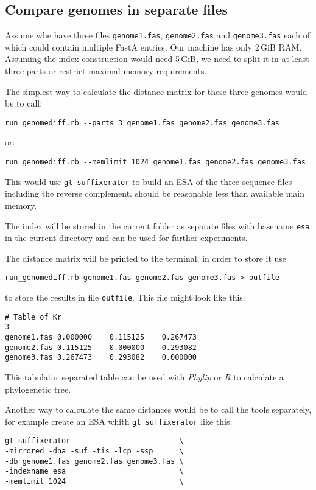 \documentclass[12pt,titlepage]{article}
\newcommand{\Gtsuffixerator}{\texttt{gt suffixerator}\xspace}
\newcommand{\ESA}{ESA\xspace}
\newcommand{\FastA}{FastA\xspace}
\newcommand{\File}[1]{\texttt{\small #1}}
\begin{document}
\subsection{Compare genomes in separate files}

Assume whe have three files \File{genome1.fas}, \File{genome2.fas} and
\File{genome3.fas} each of which could contain multiple \FastA entries. Our
machine has only 2\,GiB RAM. Assuming the index construction
would need 5\,GiB, we need to split it in at least three parts or
restrict maximal memory requirements.

The simplest way to calculate the distance matrix for these three genomes
would be to call:

\lstinline{run_genomediff.rb --parts 3 genome1.fas genome2.fas genome3.fas}

or:

\lstinline{run_genomediff.rb --memlimit 1024 genome1.fas genome2.fas genome3.fas}

This would use \Gtsuffixerator to build an \ESA of the three sequence files
including the reverse complement.  should be reasonable
less than available main memory.

The index will be stored in the current folder as separate files with
basename \File{esa} in the current directory and can be used for further
experiments.

The distance matrix will be printed to the terminal, in order to store it use

\lstinline{run_genomediff.rb genome1.fas genome2.fas genome3.fas > outfile}

to store the results in file \File{outfile}. This file might look like this:
\begin{verbatim}
# Table of Kr
3
genome1.fas	0.000000	0.115125	0.267473
genome2.fas	0.115125	0.000000	0.293082
genome3.fas	0.267473	0.293082	0.000000
\end{verbatim}

This tabulator separated table can be used with \textit{Phylip} or
\textit{R} to calculate a phylogenetic tree.

Another way to calculate the same distances would be to call the tools
separately, for example create an \ESA whith \Gtsuffixerator like this:

\begin{lstlisting}
gt suffixerator                         \
-mirrored -dna -suf -tis -lcp -ssp      \
-db genome1.fas genome2.fas genome3.fas \
-indexname esa                          \
-memlimit 1024                          \
\end{lstlisting}
\end{document}
